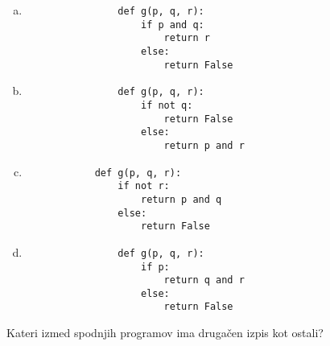 \documentclass[arhiv, 10pt]{../izpit}
\begin{document}
        \begin{multicols}{2}
        \begin{enumerate}[(a)]
\item 
                \begin{verbatim}
                def g(p, q, r):
                    if p and q:
                        return r
                    else:
                        return False
                \end{verbatim}
            
\item 
                \begin{verbatim}
                def g(p, q, r):
                    if not q:
                        return False
                    else:
                        return p and r
                \end{verbatim}
            
\item 
            \begin{verbatim}
            def g(p, q, r):
                if not r:
                    return p and q
                else:
                    return False
            \end{verbatim}
        
\item 
                \begin{verbatim}
                def g(p, q, r):
                    if p:
                        return q and r
                    else:
                        return False
                \end{verbatim}
            
\end{enumerate}

        \end{multicols}
    
        \naloga*
        
        Kateri izmed spodnjih programov ima drugačen izpis kot ostali?
    
\end{document}
